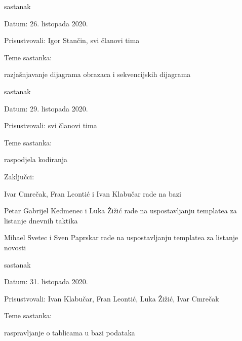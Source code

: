 \begin{packed_enum}
			\item  sastanak
			\item[] \begin{packed_item}
				\item Datum: 26. listopada 2020. 
				\item Prisustvovali: Igor Stančin, svi članovi tima
				\item Teme sastanka:
				\begin{packed_item}
					\item  razjašnjavanje dijagrama obrazaca i sekvencijskih dijagrama
				\end{packed_item}
			\end{packed_item}
			
			\item  sastanak
			\item[] \begin{packed_item}
				\item Datum: 29. listopada 2020. 
				\item Prisustvovali: svi članovi tima
				\item Teme sastanka:
				\begin{packed_item}
					\item  raspodjela kodiranja
				\end{packed_item}
				\item Zaključci:
				\begin{packed_item}
					\item Ivar Cmrečak, Fran Leontić i Ivan Klabučar rade na bazi
					\item Petar Gabrijel Kedmenec i Luka Žižić rade na uspostavljanju templatea za listanje dnevnih taktika
					\item Mihael Svetec i Sven Paprskar rade na uspostavljanju templatea za listanje novosti
				\end{packed_item}
			\end{packed_item}
		
			\item  sastanak
			\item[] \begin{packed_item}
				\item Datum: 31. listopada 2020. 
				\item Prisustvovali: Ivan Klabučar, Fran Leontić, Luka Žižić, Ivar Cmrečak
				\item Teme sastanka:
				\begin{packed_item}
					\item  raspravljanje o tablicama u bazi podataka
				\end{packed_item}
			\end{packed_item}


\end{packed_enum}
